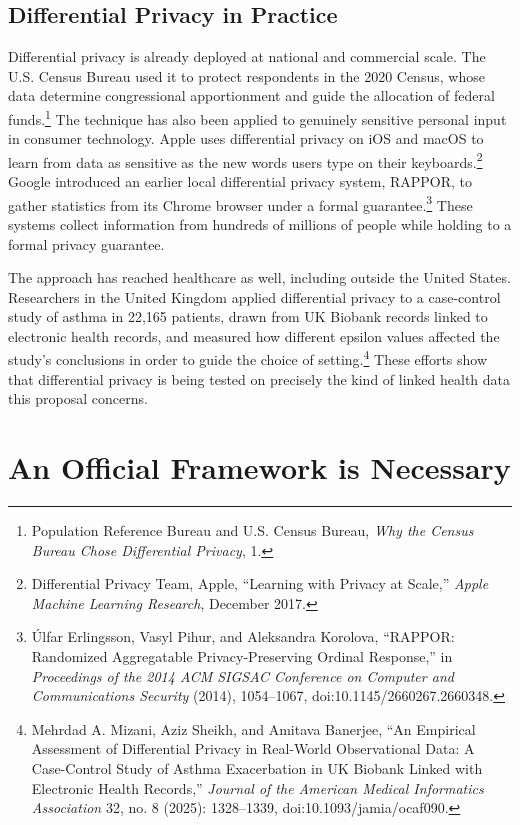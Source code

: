 \documentclass[11pt]{article}
\begin{document}
\subsection{Differential Privacy in Practice}

Differential privacy is already deployed at national and commercial scale. The U.S. Census Bureau used it to protect respondents in the 2020 Census, whose data determine congressional apportionment and guide the allocation of federal funds.\footnote{Population Reference Bureau and U.S. Census Bureau, \textit{Why the Census Bureau Chose Differential Privacy}, 1.} The technique has also been applied to genuinely sensitive personal input in consumer technology. Apple uses differential privacy on iOS and macOS to learn from data as sensitive as the new words users type on their keyboards.\footnote{Differential Privacy Team, Apple, ``Learning with Privacy at Scale,'' \textit{Apple Machine Learning Research}, December 2017.} Google introduced an earlier local differential privacy system, RAPPOR, to gather statistics from its Chrome browser under a formal guarantee.\footnote{\'Ulfar Erlingsson, Vasyl Pihur, and Aleksandra Korolova, ``RAPPOR: Randomized Aggregatable Privacy-Preserving Ordinal Response,'' in \textit{Proceedings of the 2014 ACM SIGSAC Conference on Computer and Communications Security} (2014), 1054--1067, doi:10.1145/2660267.2660348.} These systems collect information from hundreds of millions of people while holding to a formal privacy guarantee.

The approach has reached healthcare as well, including outside the United States. Researchers in the United Kingdom applied differential privacy to a case-control study of asthma in 22,165 patients, drawn from UK Biobank records linked to electronic health records, and measured how different epsilon values affected the study's conclusions in order to guide the choice of setting.\footnote{Mehrdad A. Mizani, Aziz Sheikh, and Amitava Banerjee, ``An Empirical Assessment of Differential Privacy in Real-World Observational Data: A Case-Control Study of Asthma Exacerbation in UK Biobank Linked with Electronic Health Records,'' \textit{Journal of the American Medical Informatics Association} 32, no. 8 (2025): 1328--1339, doi:10.1093/jamia/ocaf090.} These efforts show that differential privacy is being tested on precisely the kind of linked health data this proposal concerns.

\section{An Official Framework is Necessary}
\end{document}
